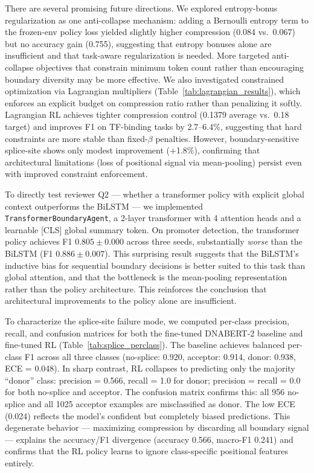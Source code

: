 \documentclass[sigconf,screen]{acmart}
\newcommand{\dnabert}{DNABERT-2\xspace}
\begin{document}
There are several promising future directions. We explored entropy-bonus regularization as one anti-collapse mechanism: adding a Bernoulli entropy term to the frozen-env policy loss yielded slightly higher compression (0.084 vs.\ 0.067) but no accuracy gain (0.755), suggesting that entropy bonuses alone are insufficient and that task-aware regularization is needed. More targeted anti-collapse objectives that constrain minimum token count rather than encouraging boundary diversity may be more effective. We also investigated constrained optimization via Lagrangian multipliers (Table~\ref{tab:lagrangian_results}), which enforces an explicit budget on compression ratio rather than penalizing it softly. Lagrangian RL achieves tighter compression control (0.1379 average vs.\ 0.18 target) and improves F1 on TF-binding tasks by 2.7--6.4\%, suggesting that hard constraints are more stable than fixed-$\beta$ penalties. However, boundary-sensitive splice-site shows only modest improvement (+1.8\%), confirming that architectural limitations (loss of positional signal via mean-pooling) persist even with improved constraint enforcement.

To directly test reviewer Q2 — whether a transformer policy with explicit global context outperforms the BiLSTM — we implemented \texttt{TransformerBoundaryAgent}, a 2-layer transformer with 4 attention heads and a learnable [CLS] global summary token. On promoter detection, the transformer policy achieves F1 $0.805\pm0.000$ across three seeds, substantially \emph{worse} than the BiLSTM (F1 $0.886\pm0.007$). This surprising result suggests that the BiLSTM's inductive bias for sequential boundary decisions is better suited to this task than global attention, and that the bottleneck is the mean-pooling representation rather than the policy architecture. This reinforces the conclusion that architectural improvements to the policy alone are insufficient.

To characterize the splice-site failure mode, we computed per-class precision, recall, and confusion matrices for both the fine-tuned \dnabert baseline and fine-tuned RL (Table~\ref{tab:splice_perclass}). The baseline achieves balanced per-class F1 across all three classes (no-splice: 0.920, acceptor: 0.914, donor: 0.938, ECE = 0.048). In sharp contrast, RL collapses to predicting only the majority ``donor'' class: precision = 0.566, recall = 1.0 for donor; precision = recall = 0.0 for both no-splice and acceptor. The confusion matrix confirms this: all 956 no-splice and all 1025 acceptor examples are misclassified as donor. The low ECE (0.024) reflects the model's confident but completely biased predictions. This degenerate behavior — maximizing compression by discarding all boundary signal — explains the accuracy/F1 divergence (accuracy 0.566, macro-F1 0.241) and confirms that the RL policy learns to ignore class-specific positional features entirely.
\end{document}
